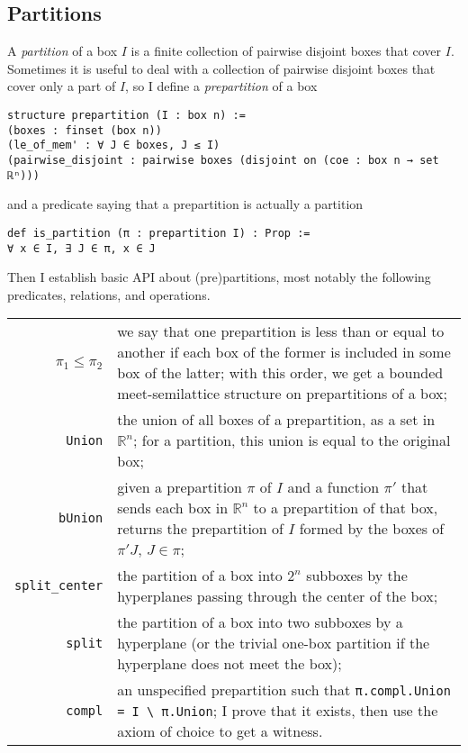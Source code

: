 \documentclass[a4paper,UKenglish,cleveref, autoref, thm-restate]{lipics-v2021}
\newcommand{\bbR}{\mathbb{R}}
\begin{document}
\subsection{Partitions}\label{sec:partitions}

A \emph{partition} of a box \(I\) is a finite collection of pairwise
disjoint boxes that cover \(I\). Sometimes it is useful to deal with a
collection of pairwise disjoint boxes that cover only a part of \(I\),
so I define a \emph{prepartition} of a box

\begin{lstlisting}[caption=Definition of a prepartition]
structure prepartition (I : box n) :=
(boxes : finset (box n))
(le_of_mem' : ∀ J ∈ boxes, J ≤ I)
(pairwise_disjoint : pairwise boxes (disjoint on (coe : box n → set ℝⁿ)))
\end{lstlisting}

and a predicate saying that a prepartition is actually a partition

\begin{lstlisting}[caption={A prepartition is a partition if it covers the whole box}]
def is_partition (π : prepartition I) : Prop :=
∀ x ∈ I, ∃ J ∈ π, x ∈ J
\end{lstlisting}

Then I establish basic API about (pre)partitions, most notably the
following predicates, relations, and operations.

\noindent%
\begin{tabular}{rp{10cm}}
  \(\pi_{1}\le\pi_{2}\)&we say that one prepartition is less than or equal to another if each box of the former is included in some box of the latter; with this order, we get a bounded meet-semilattice structure on prepartitions of a box;\\
  \lstinline=Union=&the union of all boxes of a prepartition, as a set in \(\bbR^{n}\); for a partition, this union is equal to the original box;\\
  \lstinline=bUnion=&given a prepartition \(\pi\) of \(I\) and a function \(\pi'\) that sends each box in \(\bbR^{n}\) to a prepartition of that box, returns the prepartition of \(I\) formed by the boxes of \(\pi' J\), \(J \in \pi\);\\
  \lstinline=split_center=&the partition of a box into \(2^{n}\) subboxes by the hyperplanes passing through the center of the box;\\
  \lstinline=split=&the partition of a box into two subboxes by a hyperplane (or the trivial one-box partition if the hyperplane does not meet the box);\\
  \lstinline=compl=&an unspecified prepartition such that \lstinline~π.compl.Union = I \ π.Union~; I prove that it exists, then use the axiom of choice to get a witness.
\end{tabular}
\end{document}

